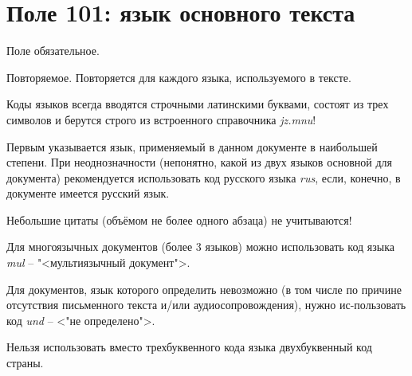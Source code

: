 \chapter{Поле 101: язык основного текста}

Поле обязательное.

Повторяемое. Повторяется для каждого языка, используемого в тексте.

Коды языков всегда вводятся строчными латинскими буквами, состоят из трех символов и берутся строго из встроенного справочника \emph{jz.mnu}!

Первым указывается язык, применяемый в данном документе в наибольшей степени. При неоднозначности (непонятно, какой из двух языков основной для документа) рекомендуется использовать код русского языка \emph{rus}, если, конечно, в документе имеется русский язык.

Небольшие цитаты (объёмом не более одного абзаца) не учитываются!

Для многоязычных документов (более 3 языков) можно использовать код языка \emph{mul} – "<мультиязычный документ">.

Для документов, язык которого определить невозможно (в том числе по причине отсутствия письменного текста и/или аудиосопровождения), нужно ис-пользовать код \emph{und} – <"не определено">.

Нельзя использовать вместо трехбуквенного кода языка двухбуквенный код страны.
